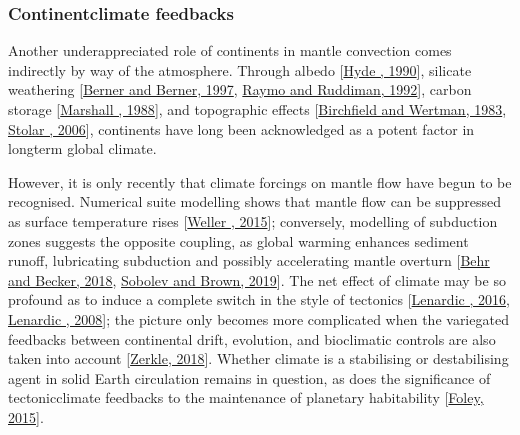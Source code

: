 \documentclass[letterpaper,10pt,english]{jupyterBook}
\begin{document}
\subsubsection{Continent\sphinxhyphen{}climate feedbacks}
\label{\detokenize{content/chapter_01_background/main:continent-climate-feedbacks}}
\sphinxAtStartPar
Another under\sphinxhyphen{}appreciated role of continents in mantle convection comes indirectly by way of the atmosphere. Through albedo {[}\hyperlink{cite.references:id537}{Hyde , 1990}{]}, silicate weathering {[}\hyperlink{cite.references:id534}{Berner and Berner, 1997}, \hyperlink{cite.references:id533}{Raymo and Ruddiman, 1992}{]}, carbon storage {[}\hyperlink{cite.references:id535}{Marshall , 1988}{]}, and topographic effects {[}\hyperlink{cite.references:id532}{Birchfield and Wertman, 1983}, \hyperlink{cite.references:id538}{Stolar , 2006}{]}, continents have long been acknowledged as a potent factor in long\sphinxhyphen{}term global climate.

\sphinxAtStartPar
However, it is only recently that climate forcings on mantle flow have begun to be recognised. Numerical suite modelling shows that mantle flow can be suppressed as surface temperature rises {[}\hyperlink{cite.references:id195}{Weller , 2015}{]}; conversely, modelling of subduction zones suggests the opposite coupling, as global warming enhances sediment runoff, lubricating subduction and possibly accelerating mantle overturn {[}\hyperlink{cite.references:id536}{Behr and Becker, 2018}, \hyperlink{cite.references:id467}{Sobolev and Brown, 2019}{]}. The net effect of climate may be so profound as to induce a complete switch in the style of tectonics {[}\hyperlink{cite.references:id398}{Lenardic , 2016}, \hyperlink{cite.references:id92}{Lenardic , 2008}{]}; the picture only becomes more complicated when the variegated feedbacks between continental drift, evolution, and bioclimatic controls are also taken into account {[}\hyperlink{cite.references:id425}{Zerkle, 2018}{]}. Whether climate is a stabilising or destabilising agent in solid Earth circulation remains in question, as does the significance of tectonic\sphinxhyphen{}climate feedbacks to the maintenance of planetary habitability {[}\hyperlink{cite.references:id354}{Foley, 2015}{]}.
\end{document}

